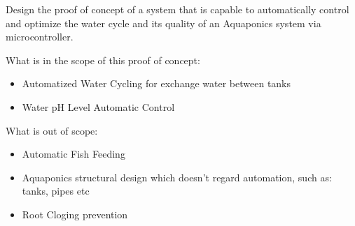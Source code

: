 Design the proof of concept of a system that is capable to automatically control and optimize the water cycle and its quality of an Aquaponics system via microcontroller.


What is in the scope of this proof of concept:
\begin{itemize}
    \item Automatized Water Cycling for exchange water between tanks
    \item Water pH Level Automatic Control
\end{itemize}

What is out of scope:
\begin{itemize}
    \item Automatic Fish Feeding
    \item Aquaponics structural design which doesn't regard automation,
        such as: tanks, pipes etc
    \item Root Cloging prevention
\end{itemize}
